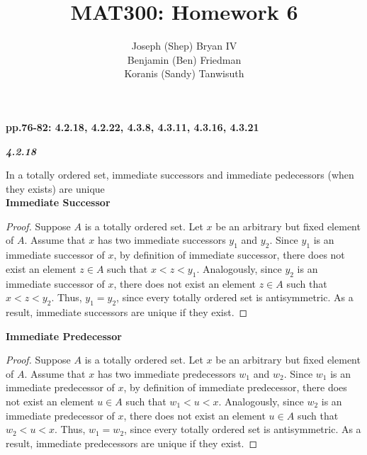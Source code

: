 \documentclass{article}
\begin{document}
\title{MAT300: Homework 6}
\author{
	Joseph (Shep) Bryan IV \\
	Benjamin (Ben) Friedman\\
	Koranis (Sandy) Tanwisuth
}

\maketitle
	\begin{flushleft}
		\textbf{pp.76-82: 4.2.18, 4.2.22, 4.3.8, 4.3.11, 4.3.16, 4.3.21}
		\\ \vspace{3mm}
		
		\textbf{\textit{4.2.18}}
		\begin{flushleft}
			In a totally ordered set, immediate successors and immediate pedecessors (when they exists) are unique 
			\\ \vspace{3mm}
			\textbf{Immediate Successor}
			\begin{proof}
				Suppose $A$ is a totally ordered set. Let $x$ be an arbitrary but fixed element of $A$. Assume that $x$ has two immediate successors $y_1$ and $y_2$. Since $y_1$ is an immediate successor of $x$, by definition of immediate successor, there does not exist an element $z \in A$ such that $x < z <y_1$. Analogously, since $y_2$ is an immediate successor of $x$, there does not exist an element $z \in A$ such that $x < z <y_2$.  Thus, $y_1 = y_2$, since every totally ordered set is antisymmetric. As a result, immediate successors are unique if they exist.
			\end{proof}
			
			\textbf{Immediate Predecessor}
			\begin{proof}
				Suppose $A$ is a totally ordered set. Let $x$ be an arbitrary but fixed element of $A$. Assume that $x$ has two immediate predecessors $w_1$ and $w_2$. Since $w_1$ is an immediate predecessor of $x$, by definition of immediate predecessor, there does not exist an element $u \in A$ such that $w_1 < u <x$. Analogously, since $w_2$ is an immediate predecessor of $x$, there does not exist an element $u \in A$ such that $w_2 < u <x$.  Thus, $w_1 = w_2$, since every totally ordered set is antisymmetric. As a result, immediate predecessors are unique if they exist.
			\end{proof}
		\end{flushleft}
		

\end{flushleft}
\end{document}
